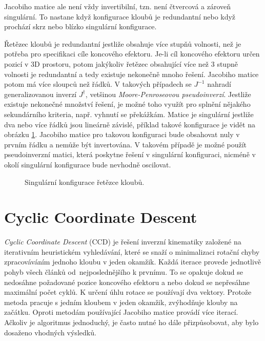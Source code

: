 Jacobiho matice ale není vždy invertibilní, tzn. není čtvercová a zároveň singulární. To nastane když konfigurace kloubů je redundantní nebo když prochází skrz nebo blízko singulární konfigurace.

Řetězec kloubů je redundantní jestliže obsahuje více stupňů volnosti, než je potřeba pro specifikaci cíle koncového efektoru. Je-li cíl koncového efektoru určen pozicí v 3D prostoru, potom jakýkoliv řetězec obsahující více než 3 stupně volnosti je redundantní a tedy existuje nekonečně mnoho řešení. Jacobiho matice potom má více sloupců než řádků. V takových případech se $J^{-1}$ nahradí generalizovanou inverzí $J^{\dagger}$, vetšinou \textit{Moore-Penroseovou pseudoinverzí}. Jestliže existuje nekonečné množství řešení, je možné toho využít pro splnění nějakého sekundárního kriteria, např. vyhnutí se překážkám.
Matice je singulární jestliže dva nebo více řádků jsou lineárně závislé, příklad takové konfigurace je vidět na obrázku \ref{singular}. Jacobiho matice pro takovou konfiguraci bude obsahovat nuly v prvním řádku a nemůže být invertována. V takovém případě je možné použít pseudoinverzní matici, která poskytne řešení v singulární konfiguraci, nicméně v okolí singulární konfigurace bude nevhodně oscilovat. 
\begin{figure}[h]
\begin{center}
\caption{Singulární konfigurace řetězce kloubů.} \label{singular}
\end{center}
\end{figure}
\section{Cyclic Coordinate Descent} \label{ccd}
\textit{Cyclic Coordinate Descent} (CCD) \cite{welman} je řešení inverzní kinematiky založené na iterativním heuristickém vyhledávání, které se snaží o minimalizaci rotační chyby  zpracováváním jednoho kloubu v jeden okamžik. Každá iterace provede jednotlivě pohyb všech článků od~nejposlednějšího k prvnímu. To se opakuje dokud se nedosáhne požadované pozice koncového efektoru a nebo dokud se nepřesáhne maximální počet cyklů. K určení úhlu rotace se používají dva vektory. Protože metoda pracuje s jedním kloubem v jeden okamžik, zvýhodňuje klouby na začátku. Oproti metodám používající Jacobiho matice provádí více iterací. Ačkoliv je algoritmus jednoduchý, je často nutné ho dále přizpůsobovat, aby bylo dosaženo vhodných výsledků.

